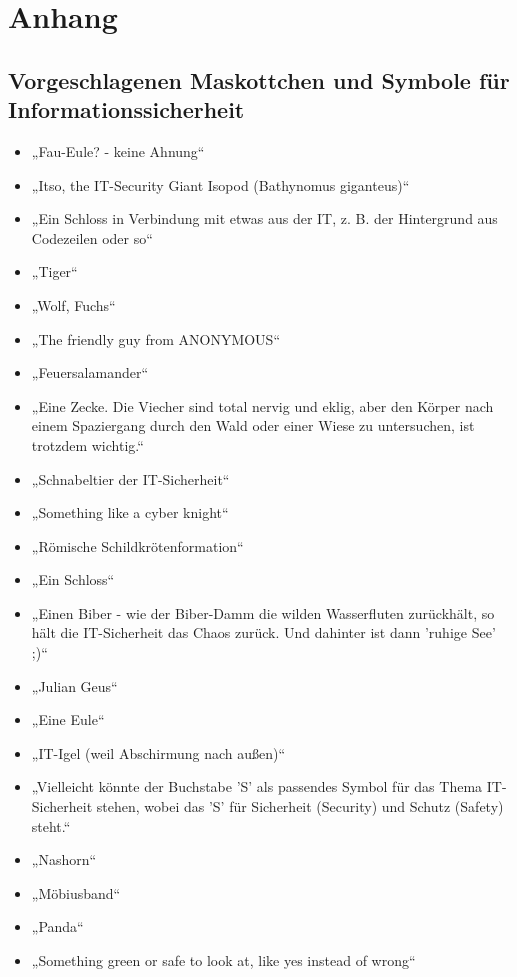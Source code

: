\documentclass[german,report]{i1thesis}
\begin{document}
\newpage
\section{Anhang}

\subsection{Vorgeschlagenen Maskottchen und Symbole für Informationssicherheit}
\label{itm:it_security_symbols}
\begin{itemize}
    \item „Fau-Eule? - keine Ahnung“
    \item „Itso, the IT-Security Giant Isopod (Bathynomus giganteus)“
    \item „Ein Schloss in Verbindung mit etwas aus der IT, z. B. der Hintergrund aus Codezeilen oder so“
    \item „Tiger“
    \item „Wolf, Fuchs“
    \item „The friendly guy from ANONYMOUS“
    \item „Feuersalamander“
    \item „Eine Zecke. Die Viecher sind total nervig und eklig, aber den Körper nach einem Spaziergang durch den Wald oder einer Wiese zu untersuchen, ist trotzdem wichtig.“
    \item „Schnabeltier der IT-Sicherheit“
    \item „Something like a cyber knight“
    \item „Römische Schildkrötenformation“
    \item „Ein Schloss“
    \item „Einen Biber - wie der Biber-Damm die wilden Wasserfluten zurückhält, so hält die IT-Sicherheit das Chaos zurück. Und dahinter ist dann 'ruhige See' ;)“
    \item „Julian Geus“
    \item „Eine Eule“
    \item „IT-Igel (weil Abschirmung nach außen)“
    \item „Vielleicht könnte der Buchstabe 'S' als passendes Symbol für das Thema IT-Sicherheit stehen, wobei das 'S' für Sicherheit (Security) und Schutz (Safety) steht.“
    \item „Nashorn“
    \item „Möbiusband“
    \item „Panda“
    \item „Something green or safe to look at, like yes instead of wrong“

\end{itemize}
\end{document}
